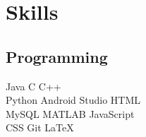 \documentclass[]{deedy-resume-openfont}
\begin{document}
\begin{minipage}[t]{0.33\textwidth}




\section{Skills}
\subsection{Programming}
Java \textbullet{}   C \textbullet{} C++\\

\textbullet{} Python \textbullet{} Android Studio \textbullet{} HTML \\ \textbullet{} MySQL \textbullet{} MATLAB \textbullet{} JavaScript\\ \textbullet{} CSS \textbullet{} Git \textbullet{} \LaTeX
\sectionsep

%
%

\end{minipage} 
\hfill
\end{document}
